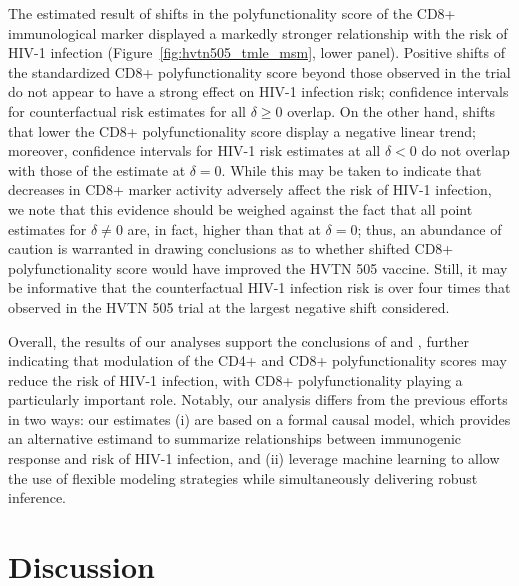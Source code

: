 The estimated result of shifts in the polyfunctionality score of the CD8+
immunological marker displayed a markedly stronger relationship with the risk of
HIV-1 infection (Figure~\ref{fig:hvtn505_tmle_msm}, lower panel). Positive
shifts of the standardized CD8+ polyfunctionality score beyond those observed in
the trial do not appear to have a strong effect on HIV-1 infection risk;
confidence intervals for counterfactual risk estimates for all $\delta \geq 0$
overlap. On the other hand, shifts that lower the CD8+ polyfunctionality score
display a negative linear trend; moreover, confidence intervals for HIV-1 risk
estimates at all $\delta < 0$ do not overlap with those of the estimate at
$\delta = 0$. While this may be taken to indicate that decreases in CD8+ marker
activity adversely affect the risk of HIV-1 infection, we note that this
evidence should be weighed against the fact that all point estimates for
$\delta \neq 0$ are, in fact, higher than that at $\delta = 0$; thus, an
abundance of caution is warranted in drawing conclusions as to whether shifted
CD8+ polyfunctionality score would have improved the HVTN 505 vaccine. Still, it
may be informative that the counterfactual HIV-1 infection risk is over four
times that observed in the HVTN 505 trial at the largest negative shift
considered.

Overall, the results of our analyses support the conclusions of
\citet{janes2017higher} and \citet{fong2018modification}, further indicating
that modulation of the CD4+ and CD8+ polyfunctionality scores may reduce the
risk of HIV-1 infection, with CD8+ polyfunctionality playing a particularly
important role. Notably, our analysis differs from the previous efforts in two
ways: our estimates (i) are based on a formal causal model, which provides an
alternative estimand to summarize relationships between immunogenic response and
risk of HIV-1 infection, and (ii) leverage  machine learning to allow the use of
flexible modeling strategies while simultaneously delivering robust inference.

\section{Discussion}\label{two_discuss}

